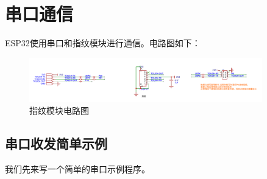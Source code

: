 \documentclass[lang=cn,newtx,10pt,scheme=chinese]{elegantbook}
\begin{document}
\chapter{串口通信}

ESP32使用串口和指纹模块进行通信。电路图如下：

\begin{figure}[!htbp]
\centering
\includegraphics[width=0.9\textwidth]{fingerprint.png}
\caption{指纹模块电路图}
\end{figure}

\section{串口收发简单示例}

我们先来写一个简单的串口示例程序。
\end{document}
